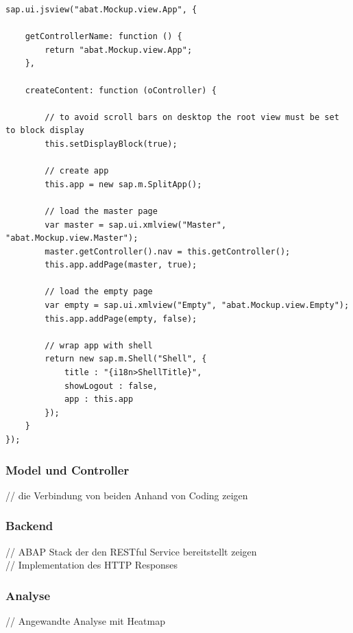 \documentclass[12pt,a4paper,bibliography=totocnumbered,listof=totocnumbered]{scrartcl}
\begin{document}
\vspace{1em}
\begin{lstlisting}[caption=Root View der Applikation, label=lst:app.view.js]
sap.ui.jsview("abat.Mockup.view.App", {

	getControllerName: function () {
		return "abat.Mockup.view.App";
	},
	
	createContent: function (oController) {
		
		// to avoid scroll bars on desktop the root view must be set to block display
		this.setDisplayBlock(true);
		
		// create app
		this.app = new sap.m.SplitApp();

		// load the master page
		var master = sap.ui.xmlview("Master", "abat.Mockup.view.Master");
		master.getController().nav = this.getController();
		this.app.addPage(master, true);
		
		// load the empty page
		var empty = sap.ui.xmlview("Empty", "abat.Mockup.view.Empty");
		this.app.addPage(empty, false);
		
		// wrap app with shell
		return new sap.m.Shell("Shell", {
			title : "{i18n>ShellTitle}",
			showLogout : false,
			app : this.app
		});
	}
});
\end{lstlisting}

\subsubsection{Model und Controller}
// die Verbindung von beiden Anhand von Coding zeigen\\

\subsubsection{Backend}
// ABAP Stack der den RESTful Service bereitstellt zeigen\\
// Implementation des HTTP Responses\\

\subsubsection{Analyse}
// Angewandte Analyse mit Heatmap\\

\pagebreak

\end{document}
